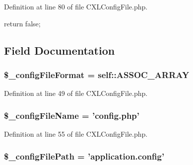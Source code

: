Definition at line 80 of file CXLConfigFile.php.




\begin{DoxyCode}
  {
    return false;
  }
\end{DoxyCode}




\subsection{Field Documentation}
\hypertarget{classCXLConfigFile_a1fb40f9b37cbaab55ce287cff87a91d0}{
\subsubsection[{\$\_\-configFileFormat}]{\setlength{\rightskip}{0pt plus 5cm}\$\_\-configFileFormat = self::ASSOC\_\-ARRAY}}
\label{classCXLConfigFile_a1fb40f9b37cbaab55ce287cff87a91d0}


Definition at line 49 of file CXLConfigFile.php.

\hypertarget{classCXLConfigFile_afa08bc5d4c18ea8c6f0b84257d53e753}{
\subsubsection[{\$\_\-configFileName}]{\setlength{\rightskip}{0pt plus 5cm}\$\_\-configFileName = 'config.php'}}
\label{classCXLConfigFile_afa08bc5d4c18ea8c6f0b84257d53e753}


Definition at line 55 of file CXLConfigFile.php.

\hypertarget{classCXLConfigFile_a9b0ea13dcf8c095cd12429d2b0cc7b96}{
\subsubsection[{\$\_\-configFilePath}]{\setlength{\rightskip}{0pt plus 5cm}\$\_\-configFilePath = 'application.config'}}
\label{classCXLConfigFile_a9b0ea13dcf8c095cd12429d2b0cc7b96}


